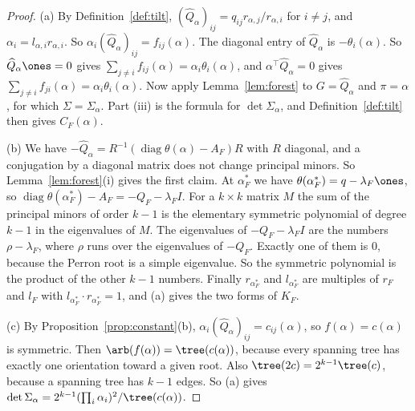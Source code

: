 \begin{proof}
(a) By Definition~\ref{def:tilt}, $(\widehat Q_\alpha)_{ij}=q_{ij}r_{\alpha,j}/r_{\alpha,i}$ for
$i\ne j$, and $\alpha_i=l_{\alpha,i}r_{\alpha,i}$. So
$\alpha_i(\widehat Q_\alpha)_{ij}=f_{ij}(\alpha)$. The diagonal entry of $\widehat Q_\alpha$ is
$-\theta_i(\alpha)$. So $\widehat Q_\alpha\ones=0$ gives
$\sum_{j\ne i}f_{ij}(\alpha)=\alpha_i\theta_i(\alpha)$, and $\alpha^\top\widehat Q_\alpha=0$
gives $\sum_{j\ne i}f_{ji}(\alpha)=\alpha_i\theta_i(\alpha)$. Now apply Lemma~\ref{lem:forest}
to $G=\widehat Q_\alpha$ and $\pi=\alpha$, for which $\Sigma=\Sigma_\alpha$. Part (iii) is the
formula for $\det\Sigma_\alpha$, and Definition~\ref{def:tilt} then gives $C_F(\alpha)$.

(b) We have $-\widehat Q_\alpha=R^{-1}(\operatorname{diag}\theta(\alpha)-A_F)R$ with $R$
diagonal, and a conjugation by a diagonal matrix does not change principal minors. So
Lemma~\ref{lem:forest}(i) gives the first claim. At $\alpha^*_F$ we have
$\theta(\alpha^*_F)=q-\lambda_F\ones$, so
$\operatorname{diag}\theta(\alpha^*_F)-A_F=-Q_F-\lambda_FI$. For a $k\times k$ matrix $M$ the sum
of the principal minors of order $k-1$ is the elementary symmetric polynomial of degree $k-1$ in
the eigenvalues of $M$. The eigenvalues of $-Q_F-\lambda_FI$ are the numbers $\rho-\lambda_F$,
where $\rho$ runs over the eigenvalues of $-Q_F$. Exactly one of them is $0$, because the Perron
root is a simple eigenvalue. So the symmetric polynomial is the product of the other $k-1$
numbers. Finally $r_{\alpha^*_F}$ and $l_{\alpha^*_F}$ are multiples of $r_F$ and $l_F$ with
$l_{\alpha^*_F}\cdot r_{\alpha^*_F}=1$, and (a) gives the two forms of $K_F$.

(c) By Proposition~\ref{prop:constant}(b),
$\alpha_i(\widehat Q_\alpha)_{ij}=c_{ij}(\alpha)$, so $f(\alpha)=c(\alpha)$ is symmetric. Then
$\arb(f(\alpha))=\tree(c(\alpha))$, because every spanning tree has exactly one orientation
toward a given root. Also $\tree(2c)=2^{k-1}\tree(c)$, because a spanning tree has $k-1$ edges.
So (a) gives $\det\Sigma_\alpha=2^{k-1}(\prod_i\alpha_i)^2/\tree(c(\alpha))$.


\end{proof}
